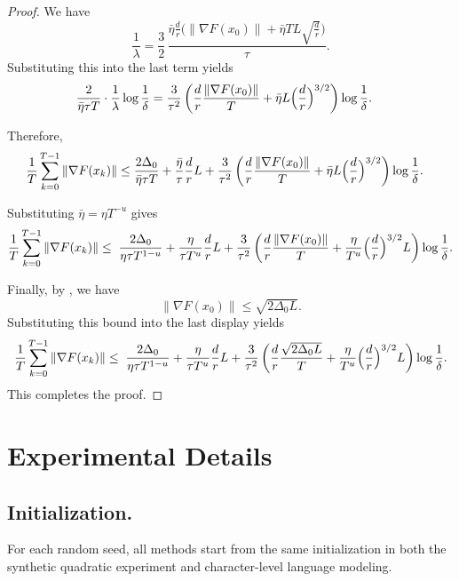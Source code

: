 \documentclass[10pt]{article}
\begin{document}
\begin{proof}
We have
\[
\frac{1}{\lambda}
=
\frac{3}{2}\,
\frac{\bar{\eta}\frac{d}{r}\bigl(\|\nabla F(x_0)\|+\bar{\eta}TL\sqrt{\frac{d}{r}}\bigr)}{\tau}.
\]
Substituting this into the last term yields
\begin{align*}
\frac{2}{\bar{\eta}\tau T}\cdot\frac{1}{\lambda}\log\frac{1}{\delta}
&=
\frac{3}{\tau^2}\left(\frac{d}{r}\frac{\|\nabla F(x_0)\|}{T}
+
\bar{\eta}L\Bigl(\frac{d}{r}\Bigr)^{3/2}\right)\log\frac{1}{\delta}.
\end{align*}

Therefore,
\begin{align*}
\frac{1}{T}\sum_{k=0}^{T-1}\|\nabla F(x_k)\|
&\le
\frac{2\Delta_0}{\bar{\eta}\tau T}
+
\frac{\bar{\eta}}{\tau}\frac{d}{r}L
+
\frac{3}{\tau^2}\left(\frac{d}{r}\frac{\|\nabla F(x_0)\|}{T}
+
\bar{\eta}L\Bigl(\frac{d}{r}\Bigr)^{3/2}\right)\log\frac{1}{\delta}.
\end{align*}

Substituting $\bar{\eta}=\eta T^{-u}$ gives
\begin{align*}
\frac{1}{T}\sum_{k=0}^{T-1}\|\nabla F(x_k)\|
\le\;
\frac{2\Delta_0}{\eta\tau T^{1-u}}
+\frac{\eta}{\tau T^{u}}\frac{d}{r}L
+\frac{3}{\tau^2}\left(
\frac{d}{r}\frac{\|\nabla F(x_0)\|}{T}
+\frac{\eta}{T^{u}}\Bigl(\frac{d}{r}\Bigr)^{3/2}L
\right)\log\frac{1}{\delta}.
\end{align*}

Finally, by , we have
\[
\|\nabla F(x_0)\|
\le
\sqrt{2\Delta_0L}.
\]
Substituting this bound into the last display yields
\begin{align*}
\frac{1}{T}\sum_{k=0}^{T-1}\|\nabla F(x_k)\|
\le\;
\frac{2\Delta_0}{\eta\tau T^{1-u}}
+\frac{\eta}{\tau T^{u}}\frac{d}{r}L
+\frac{3}{\tau^2}\left(
\frac{d}{r}\frac{\sqrt{2\Delta_0L}}{T}
+\frac{\eta}{T^{u}}\Bigl(\frac{d}{r}\Bigr)^{3/2}L
\right)\log\frac{1}{\delta}.
\end{align*}
This completes the proof.
\end{proof}


\section{Experimental Details}
\label{app:exp_details}









\subsection{Initialization.}
For each random seed, all methods start from the same initialization in both the synthetic quadratic experiment and character-level language modeling.
\end{document}
